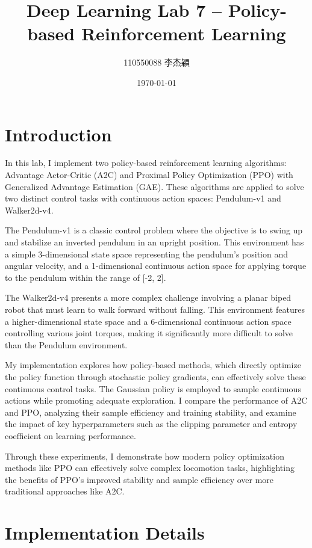 \documentclass[a4paper,twocolumn]{article}
\title{Deep Learning Lab 7 -- Policy-based Reinforcement Learning}
\author{110550088 李杰穎}
\date{\today}
\begin{document}
\maketitle
\section{Introduction}

In this lab, I implement two policy-based reinforcement learning algorithms: Advantage Actor-Critic (A2C) and Proximal Policy Optimization (PPO) with Generalized Advantage Estimation (GAE). These algorithms are applied to solve two distinct control tasks with continuous action spaces: Pendulum-v1 and Walker2d-v4.

The Pendulum-v1 is a classic control problem where the objective is to swing up and stabilize an inverted pendulum in an upright position. This environment has a simple 3-dimensional state space representing the pendulum's position and angular velocity, and a 1-dimensional continuous action space for applying torque to the pendulum within the range of [-2, 2].

The Walker2d-v4 presents a more complex challenge involving a planar biped robot that must learn to walk forward without falling. This environment features a higher-dimensional state space and a 6-dimensional continuous action space controlling various joint torques, making it significantly more difficult to solve than the Pendulum environment.

My implementation explores how policy-based methods, which directly optimize the policy function through stochastic policy gradients, can effectively solve these continuous control tasks. The Gaussian policy is employed to sample continuous actions while promoting adequate exploration. I compare the performance of A2C and PPO, analyzing their sample efficiency and training stability, and examine the impact of key hyperparameters such as the clipping parameter and entropy coefficient on learning performance.

Through these experiments, I demonstrate how modern policy optimization methods like PPO can effectively solve complex locomotion tasks, highlighting the benefits of PPO's improved stability and sample efficiency over more traditional approaches like A2C.

\section{Implementation Details}
\end{document}
